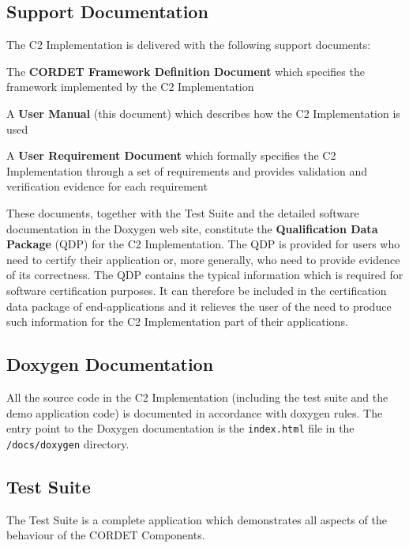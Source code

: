 \documentclass[a4paper,10pt]{article}
\newenvironment{fw_itemize}						%
{\begin{itemize}
  \setlength{\itemsep}{1mm}
  \setlength{\parskip}{0pt}
  \setlength{\parsep}{0pt}}
{\end{itemize}}
\begin{document}
\subsection{Support Documentation}\label{sec:SupportDoc}
The C2 Implementation is delivered with the following support documents: 

\begin{fw_itemize}
\item The \textbf{CORDET Framework Definition Document} which specifies the framework implemented by the C2 Implementation
\item A \textbf{User Manual} (this document) which describes how the C2 Implementation is used
\item A \textbf{User Requirement Document} which formally specifies the C2 Implementation
through a set of requirements and provides validation and verification evidence for each requirement
\end{fw_itemize}

These documents, together with the Test Suite and the detailed software documentation in the Doxygen web site, constitute the \textbf{Qualification Data Package} (QDP) for the C2 Implementation. The QDP is provided for users who need to certify their application or, more generally, who need to provide evidence of its correctness. The QDP contains the typical information which is required for software certification purposes. It can therefore be included in the certification data package of end-applications and it relieves the user of the need to produce such information for the C2 Implementation part of their applications.

\subsection{Doxygen Documentation}\label{sec:DoxygenDoc}
All the source code in the C2 Implementation (including the test suite and the demo application code) is documented in accordance with doxygen rules. The entry point to the Doxygen documentation is the \texttt{index.html} file in the \texttt{/docs/doxygen} directory.

\subsection{Test Suite}\label{sec:TestSuite}
The Test Suite is a complete application which demonstrates all aspects of the behaviour of the CORDET Components.
\end{document}
